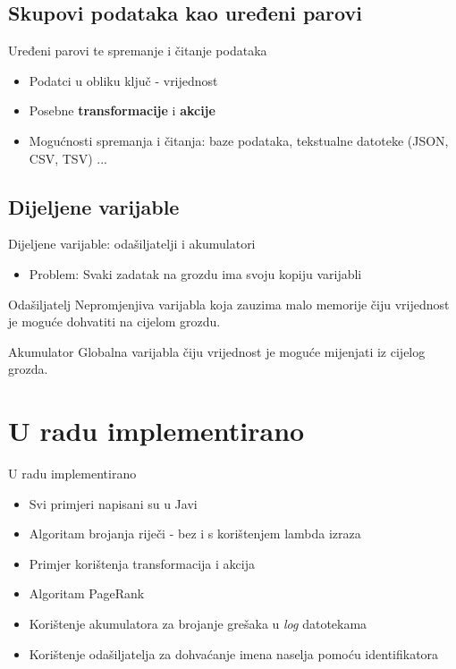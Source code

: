 \documentclass{beamer}
\begin{document}
\subsection{Skupovi podataka kao uređeni parovi}
\begin{frame}{Uređeni parovi te spremanje i čitanje podataka}
  \begin{itemize}
  \item {
 	Podatci u obliku ključ - vrijednost
 	\pause
  }
  \item {
 	Posebne \textbf{transformacije} i \textbf{akcije}
 	\pause
  }
  \item {
 	Mogućnosti spremanja i čitanja: baze podataka, tekstualne datoteke (JSON, CSV, TSV) ...
  }  
  \end{itemize}
\end{frame}
\subsection{Dijeljene varijable}
\begin{frame}{Dijeljene varijable: odašiljatelji i akumulatori}
\begin{itemize}
  \item {
 	\alert{Problem: } Svaki zadatak na grozdu ima svoju kopiju varijabli
 	\pause
  }
\end{itemize}
\begin{block}{Odašiljatelj}
	Nepromjenjiva varijabla koja zauzima malo memorije čiju vrijednost je moguće dohvatiti na cijelom grozdu.
 \end{block}  
	
  \pause
  \begin{block}{Akumulator}
	Globalna varijabla čiju vrijednost je moguće mijenjati iz cijelog grozda.
  \end{block}
 \end{frame}
  
\section{U radu implementirano}
\begin{frame}{U radu implementirano}
\begin{itemize}
  \item {
 	Svi primjeri napisani su u Javi
 	\pause
  }
  \item {
 	Algoritam brojanja riječi - bez i s korištenjem lambda izraza
 	\pause
  }
  \item {
 	Primjer korištenja transformacija i akcija
 	\pause
  }
  \item {
 	Algoritam PageRank
 	\pause
  }
  \item {
 	Korištenje akumulatora za brojanje grešaka u \emph{log} datotekama
 	\pause
  }
  \item {
 	Korištenje odašiljatelja za dohvaćanje imena naselja pomoću identifikatora
  }
\end{itemize}
 \end{frame}
\end{document}
